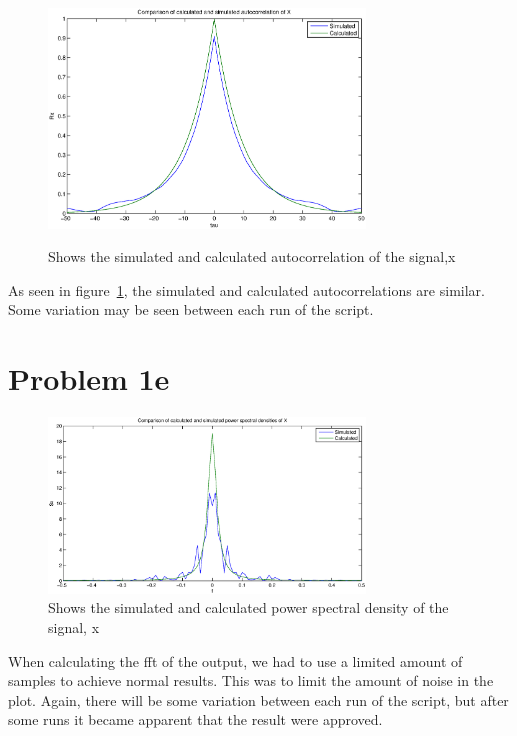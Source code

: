 	\begin{figure}[h]
	  \centering
	  \includegraphics[width=0.75\textwidth]{img/Oppgave1d}
	  \label{fig:oppave1d}
	  \caption{Shows the simulated and calculated autocorrelation of the signal,x}
	\end{figure}
	
	As seen in figure~\ref{fig:oppave1d}, the simulated and calculated autocorrelations are similar. Some variation may be seen between each run of the script. 
  
  \section{Problem 1e}
	
	\begin{figure}[h]
	  \centering
	  \includegraphics[width=0.75\textwidth]{img/Oppgave1e}
	  \caption{Shows the simulated and calculated power spectral density of the signal, x}
	\end{figure}
	
	When calculating the fft of the output, we had to use a limited amount of samples to achieve normal results. This was to limit the amount of noise in the plot.
	Again, there will be some variation between each run of the script, but after some runs it became apparent that the result were approved.